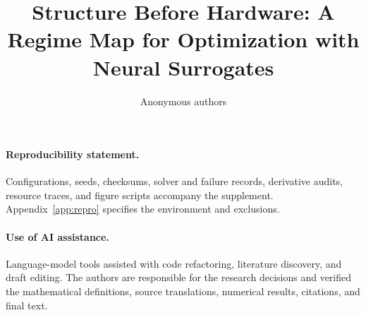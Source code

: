 \documentclass{article}
\title{Structure Before Hardware: A Regime Map for Optimization with Neural Surrogates}
\author{Anonymous authors}
\begin{document}
\maketitle
{}













\paragraph{Reproducibility statement.}
Configurations, seeds, checksums, solver and failure records, derivative
audits, resource traces, and figure scripts accompany the supplement.
Appendix~\ref{app:repro} specifies the environment and exclusions.

\paragraph{Use of AI assistance.}
Language-model tools assisted with code refactoring, literature discovery, and
draft editing.  The authors are responsible for the research decisions and
verified the mathematical definitions, source translations, numerical results,
citations, and final text.

\appendix

\end{document}
